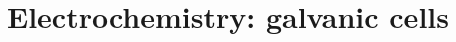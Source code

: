 \documentclass{book}
\begin{document}
 

 \section{Electrochemistry: galvanic cells}
\end{document}
